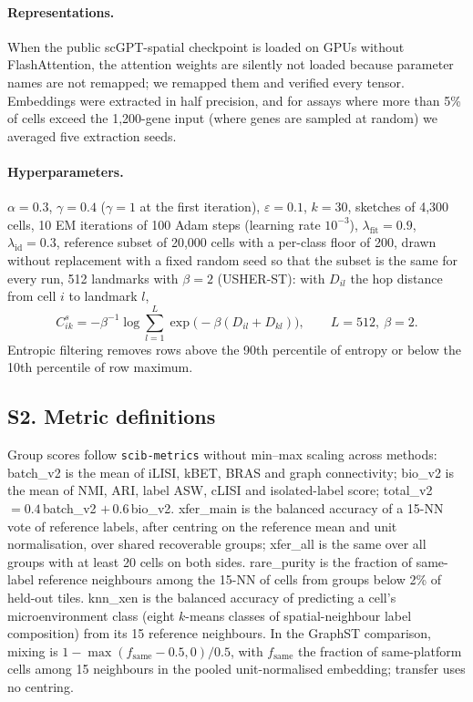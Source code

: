 \paragraph{Representations.} When the public scGPT-spatial checkpoint is loaded on GPUs without FlashAttention, the
attention weights are silently not loaded because parameter names are not remapped; we remapped them and verified
every tensor. Embeddings were extracted in half precision, and for assays where more than 5\% of cells exceed the
1{,}200-gene input (where genes are sampled at random) we averaged five extraction seeds.

\paragraph{Hyperparameters.}\label{sec:supp_hp} $\alpha=0.3$, $\gamma=0.4$ ($\gamma=1$ at the first iteration), $\varepsilon=0.1$, $k=30$,
sketches of 4{,}300 cells, 10 EM iterations of 100 Adam steps (learning rate $10^{-3}$), $\lambda_{\mathrm{fit}}=0.9$, $\lambda_{\mathrm{id}}=0.3$, reference subset of 20{,}000 cells with a per-class floor of 200, drawn without replacement with a fixed random seed so that the subset is the same for every run,
512 landmarks with $\beta=2$ (USHER-ST): with $D_{il}$ the hop distance from cell $i$ to landmark $l$,
\begin{equation}\label{eq:landmark}
  C^{s}_{ik}=-\beta^{-1}\log\textstyle\sum_{l=1}^{L}\exp\bigl(-\beta(D_{il}+D_{kl})\bigr),\qquad L=512,\ \beta=2.
\end{equation} Entropic filtering removes rows above the 90th percentile of entropy or below
the 10th percentile of row maximum.

\subsection*{S2. Metric definitions}\label{sec:supp_metrics}
Group scores follow \texttt{scib-metrics} without min--max scaling across methods: batch\_v2 is the mean of iLISI,
kBET, BRAS and graph connectivity; bio\_v2 is the mean of NMI, ARI, label ASW, cLISI and isolated-label score;
total\_v2 $=0.4\,$batch\_v2 $+\,0.6\,$bio\_v2. xfer\_main is the balanced accuracy of a 15-NN vote of reference
labels, after centring on the reference mean and unit normalisation, over shared recoverable groups; xfer\_all is the
same over all groups with at least 20 cells on both sides. rare\_purity is the fraction of same-label reference
neighbours among the 15-NN of cells from groups below 2\% of held-out tiles. knn\_xen is the balanced accuracy of
predicting a cell's microenvironment class (eight $k$-means classes of spatial-neighbour label composition) from its 15
reference neighbours. In the GraphST comparison, mixing is $1-\max(f_{\mathrm{same}}-0.5,0)/0.5$, with
$f_{\mathrm{same}}$ the fraction of same-platform cells among 15 neighbours in the pooled unit-normalised embedding;
transfer uses no centring.

